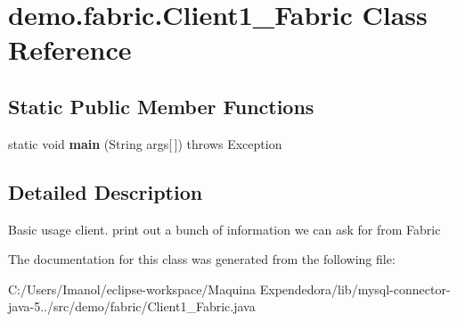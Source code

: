 \hypertarget{classdemo_1_1fabric_1_1_client1___fabric}{}\section{demo.\+fabric.\+Client1\+\_\+\+Fabric Class Reference}
\label{classdemo_1_1fabric_1_1_client1___fabric}
\subsection*{Static Public Member Functions}
\begin{DoxyCompactItemize}
\item 
\mbox{\label{classdemo_1_1fabric_1_1_client1___fabric_a5444830c6eb4ec8acf36630b946344f6}} 
static void {\bfseries main} (String args\mbox{[}$\,$\mbox{]})  throws Exception 
\end{DoxyCompactItemize}


\subsection{Detailed Description}
Basic usage client. print out a bunch of information we can ask for from Fabric 

The documentation for this class was generated from the following file\+:\begin{DoxyCompactItemize}
\item 
C\+:/\+Users/\+Imanol/eclipse-\/workspace/\+Maquina Expendedora/lib/mysql-\/connector-\/java-\/5../src/demo/fabric/Client1\+\_\+\+Fabric.\+java\end{DoxyCompactItemize}
